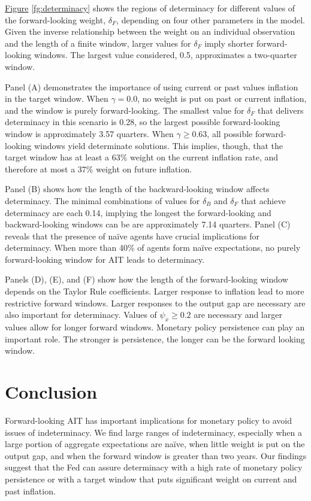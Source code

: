 \documentclass[english,authoryear,12pt]{elsarticle}
\begin{document}
\href{fg:determinacy}{Figure} \ref{fg:determinacy} shows the regions of determinacy for different values of the forward-looking weight, $\delta_F$, depending on four other parameters in the model. Given the inverse relationship between the weight on an individual observation and the length of a finite window, larger values for $\delta_F$ imply shorter forward-looking windows. The largest value considered, 0.5, approximates a two-quarter window.

Panel (A) demonstrates the importance of using current or past values inflation in the target window. When $\gamma=0.0$, no weight is put on past or current inflation, and the window is purely forward-looking. The smallest value for $\delta_F$ that delivers determinacy in this scenario is 0.28, so the largest possible forward-looking window is approximately 3.57 quarters. When $\gamma \geq 0.63$, all possible forward-looking windows yield determinate solutions. This implies, though, that the target window has at least a 63\% weight on the current inflation rate, and therefore at most a 37\% weight on future inflation.

Panel (B) shows how the length of the backward-looking window affects determinacy. The minimal combinations of values for $\delta_B$ and $\delta_F$ that achieve determinacy are each 0.14, implying the longest the forward-looking and backward-looking windows can be are approximately 7.14 quarters. Panel (C) reveals that the presence of na\"ive agents have crucial implications for determinacy. When more than 40\% of agents form na\"ive expectations, no purely forward-looking window for AIT leads to determinacy.

Panels (D), (E), and (F) show how the length of the forward-looking window depends on the Taylor Rule coefficients. Larger response to inflation lead to more restrictive forward windows. Larger responses to the output gap are necessary are also important for determinacy. Values of $\psi_x \geq 0.2$ are necessary and larger values allow for longer forward windows.  Monetary policy persistence can play an important role. The stronger is persistence, the longer can be the forward looking window.

\section{Conclusion}

Forward-looking AIT has important implications for monetary policy to avoid issues of indeterminacy. We find large ranges of indeterminacy, especially when a large portion of aggregate expectations are na\"ive, when little weight is put on the output gap, and when the forward window is greater than two years. Our findings suggest that the Fed can assure determinacy with a high rate of monetary policy persistence or with a target window that puts significant weight on current and past inflation.



\end{document}
